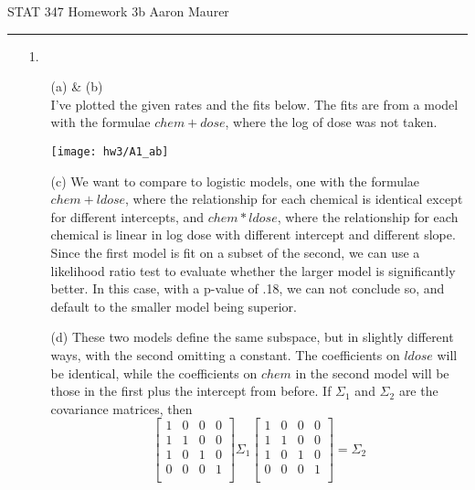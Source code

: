 \documentclass[11pt]{article}
\theoremstyle{definition}
\newcommand{\hwhead}[1]{#1 \hfill Aaron Maurer \vspace{2mm} \hrule \vspace{2mm}}
\begin{document}
\hwhead{STAT 347 Homework 3b}
\begin{itemize}
    \item[1.]
        \begin{itemize}
            \item[(a)] \& (b) \\
                I've plotted the given rates and the fits below. The fits are from a model with the formulae \(chem +dose\), where the log of dose was not taken.
                \begin{center}
                    \texttt{[image: hw3/A1\_ab]} 
                \end{center}
            \item[(c)]
                We want to compare to logistic models, one with the formulae \(chem + ldose\), where the relationship for each chemical is identical except for different intercepts, and \(chem*ldose\), where the relationship for each chemical is linear in log dose with different intercept and different slope. Since the first model is fit on a subset of the second, we can use a likelihood ratio test to evaluate whether the larger model is significantly better. In this case, with a p-value of .18, we can not conclude so, and default to the smaller model being superior.
            \item[(d)]
                These two models define the same subspace, but in slightly different ways, with the second omitting a constant. The coefficients on $ldose$ will be identical, while the coefficients on $chem$ in the second model will be those in the first plus the intercept from before. If $\Sigma_1$ and $\Sigma_2$ are the covariance matrices, then
                \[\left[\begin{array}{cccc} 1 & 0 & 0 & 0 \\
                                            1 & 1 & 0 & 0 \\
                                            1 & 0 & 1 & 0 \\
                                            0 & 0 & 0 & 1 \\
                           \end{array}\right] \Sigma_1
                   \left[\begin{array}{cccc} 1 & 0 & 0 & 0 \\
                                             1 & 1 & 0 & 0 \\
                                             1 & 0 & 1 & 0 \\
                                             0 & 0 & 0 & 1 \\
                           \end{array}\right] = \Sigma_2 \]
                       

\end{itemize}
\end{itemize}
\end{document}
